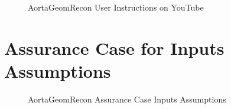 \begin{figure}[H]
    \centering
    \caption[AortaGeomRecon User Instructions on YouTube]{AortaGeomRecon User Instructions on YouTube}
    \label{fig_video}
\end{figure}


\section{Assurance Case for Inputs Assumptions}

\begin{figure}[H]
    \centering
    \caption[AortaGeomRecon Assurance Case Inputs Assumptions]{AortaGeomRecon Assurance Case Inputs Assumptions}
    \label{fig_agr_ac_ga}
\end{figure}

